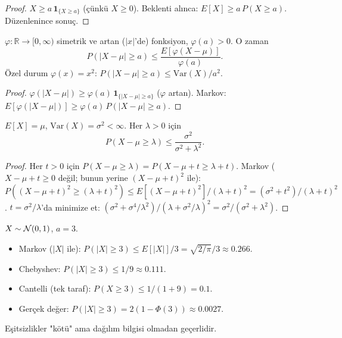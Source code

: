 \begin{proof}
$X \geq a\,\mathbf{1}_{\{X \geq a\}}$ (çünkü $X \geq 0$).
Beklenti alınca: $E[X] \geq a\,P(X \geq a)$. Düzenlenince sonuç.
\end{proof}

\begin{teorem}
\label{thm:chebyshev_genellestirilmis}
$\varphi : \mathbb{R} \to [0, \infty)$ simetrik ve artan ($|x|$'de) fonksiyon,
$\varphi(a) > 0$. O zaman
\[
  P(|X - \mu| \geq a) \leq \frac{E[\varphi(X-\mu)]}{\varphi(a)}.
\]
Özel durum $\varphi(x) = x^2$: $P(|X-\mu|\geq a) \leq \mathrm{Var}(X)/a^2$.
\end{teorem}

\begin{proof}
$\varphi(|X-\mu|) \geq \varphi(a)\,\mathbf{1}_{\{|X-\mu| \geq a\}}$ ($\varphi$ artan).
Markov: $E[\varphi(|X-\mu|)] \geq \varphi(a)\,P(|X-\mu|\geq a)$.
\end{proof}

\begin{teorem}
\label{thm:cantelli}
$E[X] = \mu$, $\mathrm{Var}(X) = \sigma^2 < \infty$. Her $\lambda > 0$ için
\[
  P(X - \mu \geq \lambda) \leq \frac{\sigma^2}{\sigma^2 + \lambda^2}.
\]
\end{teorem}

\begin{proof}
Her $t > 0$ için $P(X-\mu \geq \lambda) = P(X-\mu+t \geq \lambda+t)$.
Markov ($X-\mu+t \geq 0$ değil; bunun yerine $(X-\mu+t)^2$ ile):
$P((X-\mu+t)^2 \geq (\lambda+t)^2) \leq E[(X-\mu+t)^2]/(\lambda+t)^2 = (\sigma^2+t^2)/(\lambda+t)^2$.
$t = \sigma^2/\lambda$'da minimize et: $(\sigma^2 + \sigma^4/\lambda^2)/(\lambda + \sigma^2/\lambda)^2 = \sigma^2/(\sigma^2+\lambda^2)$.
\end{proof}

\begin{ornek}
$X \sim \mathcal{N}(0,1)$, $a = 3$.
\begin{itemize}
  \item Markov ($|X|$ ile): $P(|X| \geq 3) \leq E[|X|]/3 = \sqrt{2/\pi}/3 \approx 0.266$.
  \item Chebyshev: $P(|X| \geq 3) \leq 1/9 \approx 0.111$.
  \item Cantelli (tek taraf): $P(X \geq 3) \leq 1/(1+9) = 0.1$.
  \item Gerçek değer: $P(|X| \geq 3) = 2(1-\Phi(3)) \approx 0.0027$.
\end{itemize}
Eşitsizlikler "kötü" ama dağılım bilgisi olmadan geçerlidir.
\end{ornek}


